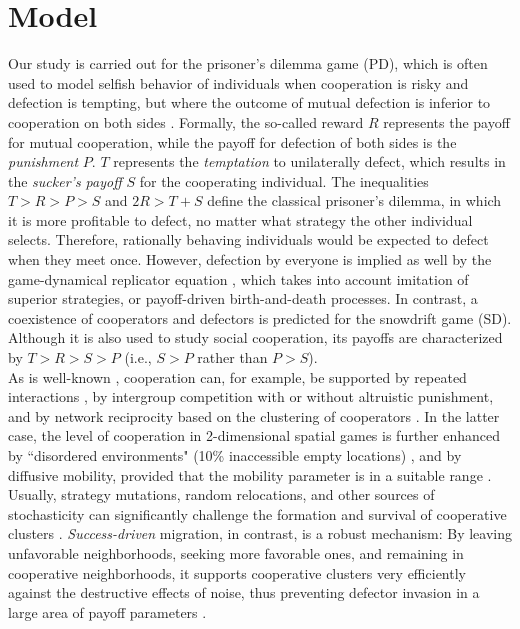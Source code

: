 \section*{Model}
Our study is carried out for the prisoner's dilemma game (PD), which is often used to model selfish behavior of individuals when cooperation is risky and defection is tempting, but where the outcome of mutual defection is inferior to cooperation on both sides \cite{axelrod1981evolution,nowak2006five}. Formally, the so-called reward $R$ represents the payoff for mutual cooperation, while the payoff for defection of both sides is the {\it punishment} $P$. $T$ represents the {\it temptation} to unilaterally defect, which results in the {\it sucker's payoff} $S$ for the cooperating individual. The inequalities $T > R > P > S$ and $2R > T + S$ define the classical prisoner's dilemma, in which it is more profitable to defect, no matter what strategy the other individual selects. Therefore, rationally behaving individuals would be expected to defect when they meet once. However, defection by everyone is implied as well by the game-dynamical replicator
equation \cite{epstein1998zones}, which takes into account imitation of superior strategies, or payoff-driven birth-and-death processes. In contrast, a coexistence of cooperators and defectors is predicted for the snowdrift game (SD). Although it is also used to study social cooperation, its payoffs are characterized by $T > R > S > P$ (i.e., $S > P$ rather than $P > S$).\\

As is well-known \cite{nowak2006five}, cooperation can, for example, be supported by repeated interactions \cite{axelrod1981evolution}, by intergroup competition with or without altruistic punishment\cite{traulsen2006evolution,fehr2002altruistic,boyd2003evolution}, and by network reciprocity based on the clustering of cooperators \cite{nowak1992evolutionary,szabo2002phase,hauert2004spatial}. In the latter case, the level of cooperation in 2-dimensional spatial games is further enhanced by ``disordered environments" (10\% inaccessible empty locations) \cite{vainstein2001disordered}, and by
diffusive mobility, provided that the mobility parameter is in a suitable range \cite{vainstein2007does}. Usually, strategy mutations, random relocations, and other sources of stochasticity can significantly challenge the formation and survival of cooperative clusters \cite{}. {\it Success-driven} migration, in contrast, is a robust mechanism: By leaving unfavorable neighborhoods, seeking more favorable
ones, and remaining in cooperative neighborhoods, it supports cooperative clusters very efficiently against the destructive effects of noise, thus preventing defector invasion in a large area of payoff parameters \cite{helbing2009outbreak}.\\


